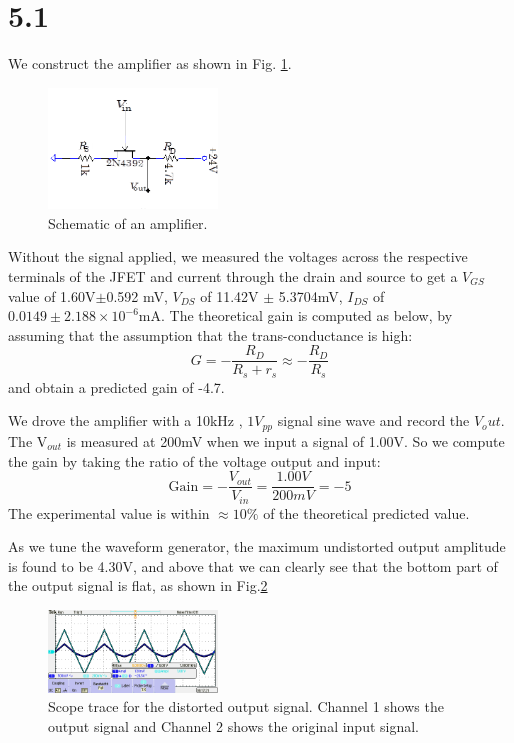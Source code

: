 \documentclass[authoryear, 12pt,5p, times]{elsarticle}
\begin{document}
\section*{5.1}
We construct the amplifier as shown in Fig. \ref{q1setup}.
 \begin{figure}[h!]
 \centering
 \includegraphics[width=0.4\textwidth]{figure/q1setup}
\caption{Schematic of an amplifier.}
\label{q1setup}
 \end{figure}
\par Without the signal applied, we measured the voltages across the respective terminals of the JFET and current through the drain and source to get a $V_{GS}$ value of 1.60V$\pm$0.592 mV,  $V_{DS}$ of 11.42V $\pm$ 5.3704mV,  $I_{DS}$ of  $0.0149\pm 2.188\times 10^{-6}$mA. The theoretical gain is computed as below, by assuming that the assumption that the trans-conductance is high: 
\begin{equation}
G = - \frac{R_D}{R_s+r_s}\approx -\frac{R_D}{R_s}
\end{equation}
and obtain a predicted gain of -4.7.%
\par We drove the amplifier with a 10kHz , $1V_{pp}$ signal sine wave and record the $V_out$. The V$_{out}$ is measured at 200mV when we input a signal of 1.00V. So we compute the gain by taking the ratio of the voltage output and input:
\begin{equation}
\text{Gain} = -\frac{V_{out}}{V_{in}}=\frac{1.00V}{200mV}=-5
\label{gain_experimental}
\end{equation}
The experimental value is within $\approx 10\%$ of the theoretical predicted value.
\par As we tune the waveform generator, the maximum undistorted output amplitude is found to be 4.30V, and above that we can clearly see that the bottom part of the output signal is flat, as shown in Fig.\ref{q1trace} 
 \begin{figure}[h!]
 \centering
 \includegraphics[width=0.4\textwidth]{figure/q1trace}
\caption{Scope trace for the distorted output signal. Channel 1 shows the output signal and Channel 2 shows the original input signal.}
\label{q1trace}
 \end{figure}
\end{document}
